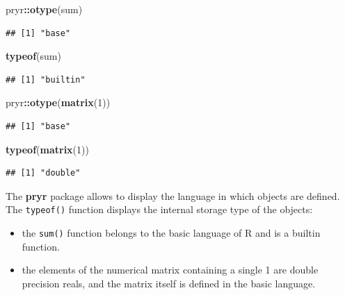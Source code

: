 \documentclass[
  12pt,
  american,
  a4paper,
  extrafontsizes,onecolumn,openright
  ]{memoir}
\newenvironment{Shaded}{\begin{snugshade}}{\end{snugshade}}
\newcommand{\DecValTok}[1]{\textcolor[rgb]{0.00,0.00,0.81}{#1}}
\newcommand{\FunctionTok}[1]{\textcolor[rgb]{0.13,0.29,0.53}{\textbf{#1}}}
\newcommand{\NormalTok}[1]{#1}
\newcommand{\SpecialCharTok}[1]{\textcolor[rgb]{0.81,0.36,0.00}{\textbf{#1}}}
\providecommand{\tightlist}{%
  \setlength{\itemsep}{0pt}\setlength{\parskip}{0pt}}
\begin{document}
\scriptsize

\begin{Shaded}
\begin{Highlighting}[]
\NormalTok{pryr}\SpecialCharTok{::}\FunctionTok{otype}\NormalTok{(sum)}
\end{Highlighting}
\end{Shaded}

\begin{verbatim}
## [1] "base"
\end{verbatim}

\begin{Shaded}
\begin{Highlighting}[]
\FunctionTok{typeof}\NormalTok{(sum)}
\end{Highlighting}
\end{Shaded}

\begin{verbatim}
## [1] "builtin"
\end{verbatim}

\begin{Shaded}
\begin{Highlighting}[]
\NormalTok{pryr}\SpecialCharTok{::}\FunctionTok{otype}\NormalTok{(}\FunctionTok{matrix}\NormalTok{(}\DecValTok{1}\NormalTok{))}
\end{Highlighting}
\end{Shaded}

\begin{verbatim}
## [1] "base"
\end{verbatim}

\begin{Shaded}
\begin{Highlighting}[]
\FunctionTok{typeof}\NormalTok{(}\FunctionTok{matrix}\NormalTok{(}\DecValTok{1}\NormalTok{))}
\end{Highlighting}
\end{Shaded}

\begin{verbatim}
## [1] "double"
\end{verbatim}

\normalsize

The \textbf{pryr} package allows to display the language in which objects are defined.
The \texttt{typeof()} function displays the internal storage type of the objects:

\begin{itemize}
\tightlist
\item
  the \texttt{sum()} function belongs to the basic language of R and is a builtin function.
\item
  the elements of the numerical matrix containing a single 1 are double precision reals, and the matrix itself is defined in the basic language.
\end{itemize}
\end{document}
